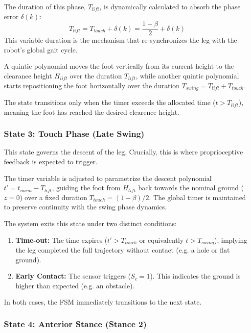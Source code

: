 The duration of this phase, $T_{lift}$, is dynamically calculated to absorb the phase error $\delta(k)$:
\begin{equation}
  T_{lift} = T_{touch} + \delta(k) = \frac{1-\beta}{2} + \delta(k)
\end{equation}
This variable duration is the mechanism that re-synchronizes the leg with the robot's global gait cycle.

A quintic polynomial moves the foot vertically from its current height to the clearance height $H_{lift}$ over
the duration $T_{lift}$, while another quintic polynomial starts repositioning the foot horizontally over the
duration $T_{swing} = T_{lift} + T_{touch}$.

The state transitions only when the timer exceeds the allocated time ($t > T_{lift}$), meaning the foot has
reached the desired clearence height.


\subsubsection{State 3: Touch Phase (Late Swing)}

This state governs the descent of the leg. Crucially, this is where proprioceptive feedback is expected to trigger.

The timer variable is adjusted to parametrize the descent polynomial $t' = t_{norm} - T_{lift}$, guiding the
foot from $H_{lift}$ back towards the nominal ground ($z = 0$) over a fixed duration $T_{touch} = (1-\beta)/2$.
The global timer is maintained to preserve continuity with the swing phase dynamics.

The system exits this state under two distinct conditions:

\begin{enumerate}
  \item \textbf{Time-out:} The time expires ($t' > T_{touch}$ or equivalently $t > T_{swing}$), implying the leg
    completed the full trajectory without contact (e.g. a hole or flat ground).
  \item \textbf{Early Contact:} The sensor triggers ($S_c = 1$). This indicates the ground is higher
    than expected (e.g. an obstacle).
\end{enumerate}

In both cases, the FSM immediately transitions to the next state.


\subsubsection{State 4: Anterior Stance (Stance 2)}


